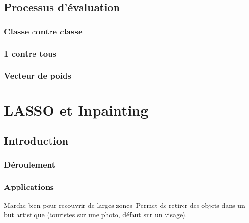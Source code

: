 \documentclass[a4paper]{memoir}
\begin{document}
\subsection{Processus d'évaluation}
\subsubsection{Classe contre classe}


\subsubsection{1 contre tous}



\subsubsection{Vecteur de poids}



\newpage
\section{LASSO et Inpainting}
\subsection{Introduction}
\subsubsection{Déroulement}


\subsubsection{Applications}
Marche bien pour recouvrir de larges zones. Permet de retirer des objets dans un but artistique (touristes sur une photo, défaut sur un visage).
\end{document}
